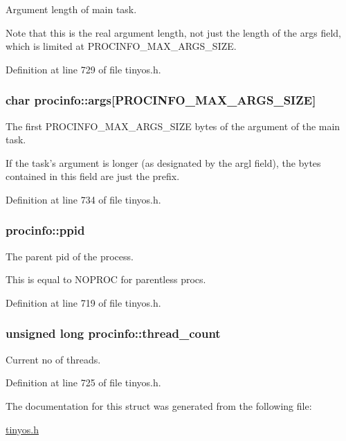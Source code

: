 Argument length of main task. 

Note that this is the real argument length, not just the length of the {\ttfamily args} field, which is limited at {\ttfamily P\-R\-O\-C\-I\-N\-F\-O\-\_\-\-M\-A\-X\-\_\-\-A\-R\-G\-S\-\_\-\-S\-I\-Z\-E}. 

Definition at line 729 of file tinyos.\-h.

\hypertarget{structprocinfo_ac812ea3215fafc8ced9f91320b2d3959}{
\subsubsection[{args}]{\setlength{\rightskip}{0pt plus 5cm}char procinfo\-::args\mbox{[}{\bf P\-R\-O\-C\-I\-N\-F\-O\-\_\-\-M\-A\-X\-\_\-\-A\-R\-G\-S\-\_\-\-S\-I\-Z\-E}\mbox{]}}}\label{structprocinfo_ac812ea3215fafc8ced9f91320b2d3959}


The first {\ttfamily P\-R\-O\-C\-I\-N\-F\-O\-\_\-\-M\-A\-X\-\_\-\-A\-R\-G\-S\-\_\-\-S\-I\-Z\-E} bytes of the argument of the main task. 

If the task's argument is longer (as designated by the {\ttfamily argl} field), the bytes contained in this field are just the prefix. 

Definition at line 734 of file tinyos.\-h.

\hypertarget{structprocinfo_a790970c70987013b2712b7dd6d2b75b9}{
\subsubsection[{ppid}]{ procinfo\-::ppid}}\label{structprocinfo_a790970c70987013b2712b7dd6d2b75b9}


The parent pid of the process. 

This is equal to N\-O\-P\-R\-O\-C for parentless procs. 

Definition at line 719 of file tinyos.\-h.

\hypertarget{structprocinfo_ae1ed3afa8904729a1daf1b51780cf2cf}{
\subsubsection[{thread\-\_\-count}]{\setlength{\rightskip}{0pt plus 5cm}unsigned long procinfo\-::thread\-\_\-count}}\label{structprocinfo_ae1ed3afa8904729a1daf1b51780cf2cf}
Current no of threads. 

Definition at line 725 of file tinyos.\-h.



The documentation for this struct was generated from the following file\-:\begin{DoxyCompactItemize}
\item 
\hyperlink{tinyos_8h}{tinyos.\-h}\end{DoxyCompactItemize}
